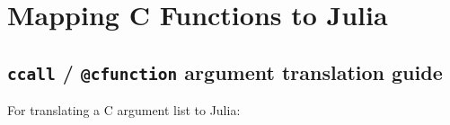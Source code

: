 \hypertarget{6114319820079574946}{}


\section{Mapping C Functions to Julia}



\hypertarget{14464013813592582244}{}


\subsection{\texttt{ccall} / \texttt{@cfunction} argument translation guide}



For translating a C argument list to Julia:



